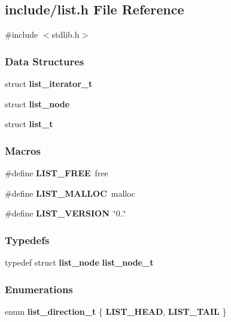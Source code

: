 \subsection{include/list.h File Reference}
\label{a00029}
{\ttfamily \#include $<$stdlib.\+h$>$}\newline
\subsubsection*{Data Structures}
\begin{DoxyCompactItemize}
\item 
struct \textbf{ list\+\_\+iterator\+\_\+t}
\item 
struct \textbf{ list\+\_\+node}
\item 
struct \textbf{ list\+\_\+t}
\end{DoxyCompactItemize}
\subsubsection*{Macros}
\begin{DoxyCompactItemize}
\item 
\#define \textbf{ L\+I\+S\+T\+\_\+\+F\+R\+EE}~free
\item 
\#define \textbf{ L\+I\+S\+T\+\_\+\+M\+A\+L\+L\+OC}~malloc
\item 
\#define \textbf{ L\+I\+S\+T\+\_\+\+V\+E\+R\+S\+I\+ON}~\char`\"{}0..\char`\"{}
\end{DoxyCompactItemize}
\subsubsection*{Typedefs}
\begin{DoxyCompactItemize}
\item 
typedef struct \textbf{ list\+\_\+node} \textbf{ list\+\_\+node\+\_\+t}
\end{DoxyCompactItemize}
\subsubsection*{Enumerations}
\begin{DoxyCompactItemize}
\item 
enum \textbf{ list\+\_\+direction\+\_\+t} \{ \textbf{ L\+I\+S\+T\+\_\+\+H\+E\+AD}, 
\textbf{ L\+I\+S\+T\+\_\+\+T\+A\+IL}
 \}
\end{DoxyCompactItemize}
